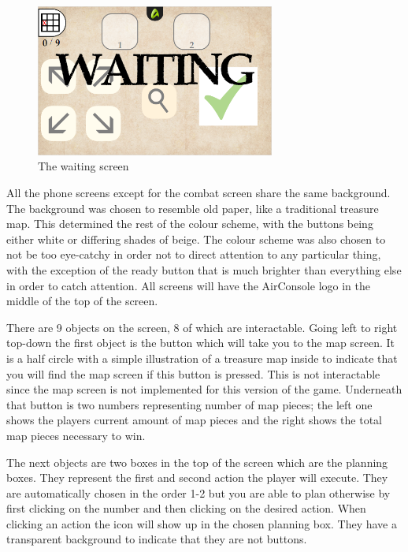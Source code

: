 \begin{figure}[h!]
	\centering
	\includegraphics[width=0.7\textwidth]{figures/waitingScreen.png}
	\caption{The waiting screen}
	\label{fig:wait}
\end{figure}

All the phone screens except for the combat screen share the same background. The background was chosen to resemble old paper, like a traditional treasure map. This determined the rest of the colour scheme, with the buttons being either white or differing shades of beige. The colour scheme was also chosen to not be too eye-catchy in order not to direct attention to any particular thing, with the exception of the ready button that is much brighter than everything else in order to catch attention. All screens will have the AirConsole logo in the middle of the top of the screen. 

There are 9 objects on the screen, 8 of which are interactable.
Going left to right top-down the first object is the button which will take you to the map screen. It is a half circle with a simple illustration of a treasure map inside to indicate that you will find the map screen if this button is pressed. This is not interactable since the map screen is not implemented for this version of the game. Underneath that button is two numbers representing number of map pieces; the left one shows the players current amount of map pieces and the right shows the total map pieces necessary to win.

The next objects are two boxes in the top of the screen which are the planning boxes. They represent the first and second action the player will execute. They are automatically chosen in the order 1-2 but you are able to plan otherwise by first clicking on the number and then clicking on the desired action. When clicking an action the icon will show up in the chosen planning box. They have a transparent background to indicate that they are not buttons. 

